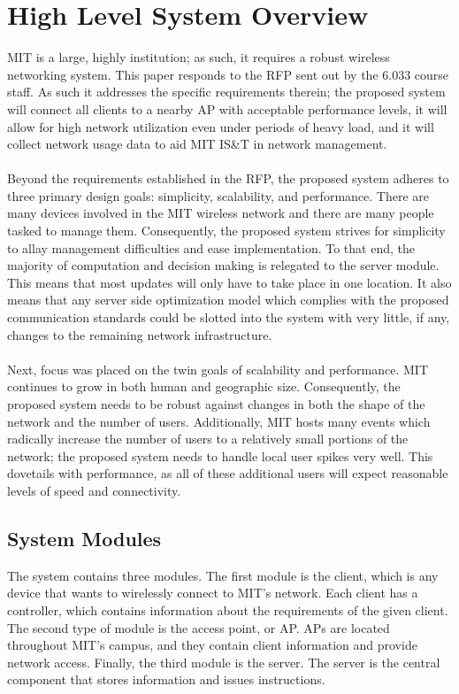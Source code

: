 \documentclass[10pt,journal,compsoc]{IEEEtran}
\begin{document}
		\section{High Level System Overview}
		MIT is a large, highly institution; as such, it requires a robust wireless networking system.  This paper responds to the RFP sent out by the 6.033 course staff. As such it addresses  the specific requirements therein; the proposed system will connect all clients to a nearby AP with acceptable performance levels, it will allow for high network utilization even under periods of heavy load, and it will collect network usage data to aid MIT IS\&T in network management.\\
		\\
		Beyond the requirements established in the RFP, the proposed system adheres to three primary design goals: simplicity, scalability, and performance. There are many devices involved in the MIT wireless network and there are many people tasked to manage them. Consequently, the proposed system strives for simplicity to allay management difficulties and ease implementation. To that end, the majority of computation and decision making is relegated to the server module. This means that most updates will only have to take place in one location. It also means that any server side optimization model which complies with the proposed communication standards could be slotted into the system with very little, if any, changes to the remaining network infrastructure.\\
		\\
		Next, focus was placed on the twin goals of scalability and performance. MIT continues to grow in both human and geographic size. Consequently, the proposed system needs to be robust against changes in both the shape of the network and the number of users. Additionally, MIT hosts many events which radically increase the number of users to a relatively small portions of the network; the proposed system needs to handle local user spikes very well. This dovetails with performance, as all of these additional users will expect reasonable levels of speed and connectivity.
		
		\subsection{System Modules}
		The system contains three modules. The first module is the client, which is any device that wants to wirelessly connect to MIT's network. Each client has a controller, which contains information about the requirements of the given client. The second type of module is the access point, or AP. APs are located throughout MIT's campus, and they contain client information and provide network access. Finally, the third module is the server. The server is the central component that stores information and issues instructions.
		
\end{document}
